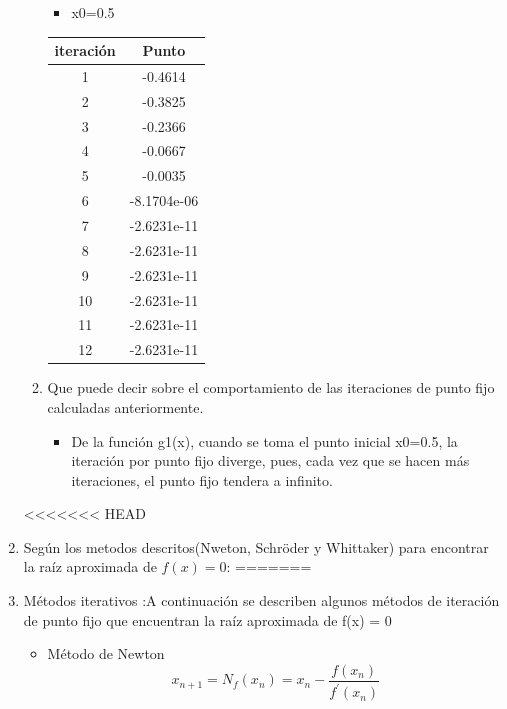 \documentclass{udparticle}
\begin{document}
\begin{enumerate}
\begin{enumerate}
\begin{table}[H]
\begin{tabular} { |c|c|}
        \end{tabular}
        
    \end{table}
     \begin{itemize}
\item x0=0.5
\end{itemize}
\begin{table}[H]
    \centering
        \begin{tabular} { |c|c|}
        \hline
        iteración  &  Punto\\
        \hline
        1 &  -0.4614      \\
         \hline
        2 &   -0.3825   \\
         \hline
        3 &  -0.2366 \\
         \hline
        4 &  -0.0667    \\
         \hline
        5 &   -0.0035 \\
         \hline
        6 & -8.1704e-06     \\
         \hline
        7 &     -2.6231e-11 \\
         \hline
        8 &   -2.6231e-11   \\
         \hline
        9 &        -2.6231e-11 \\
         \hline
        10 &     -2.6231e-11    \\
         \hline
        11 &    -2.6231e-11 \\
         \hline
        12 &    -2.6231e-11  \\
        \hline
        \end{tabular}
    \end{table}
\vspace{3cm}
\item Que puede decir sobre el comportamiento de las iteraciones de punto fijo calculadas anteriormente.
\begin{itemize}

\item De la función g1(x), cuando se toma el punto inicial x0=0.5, la iteración por punto fijo diverge, pues, cada vez que se hacen más iteraciones, el punto fijo tendera a infinito. 
\end{itemize}

\end{enumerate}
<<<<<<< HEAD
\item Según los metodos descritos(Nweton, Schröder y Whittaker) para encontrar la raíz aproximada de $f(x)=0$:
=======
\newpage
\item Métodos iterativos :A continuación se describen algunos métodos de iteración de punto fijo que encuentran la raíz aproximada de f(x) = 0
\begin{itemize}
        \item Método de Newton     
            \begin{equation*}
                 x_{n+1}=N_f(x_n)=x_n -  \frac{f(x_n)}{f^{'}(x_n)}
            \end{equation*}
        

\end{itemize}
\end{enumerate}
\end{document}
